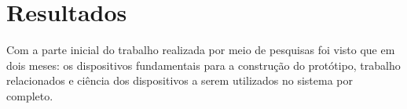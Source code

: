 \chapter{Resultados}\label{CAP5}


Com a parte inicial do trabalho realizada por meio de pesquisas foi visto que em dois meses: os dispositivos fundamentais para a construção do protótipo, trabalho relacionados e ciência dos dispositivos a serem utilizados no sistema por completo.
